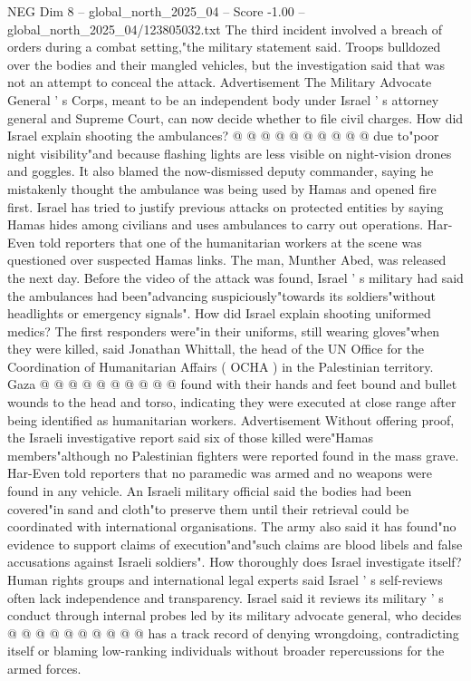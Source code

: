 \begin{textsample}{NEG Dim 8 – global\_north\_2025\_04 – Score -1.00 – global\_north\_2025\_04/123805032.txt}
The third incident involved a breach of orders during a combat setting,"the military statement said.
Troops bulldozed over the bodies and their mangled vehicles, but the investigation said that was not an attempt to conceal the attack.
Advertisement The Military Advocate General ' s Corps, meant to be an independent body under Israel ' s attorney general and Supreme Court, can now decide whether to file civil charges.
How did Israel explain shooting the ambulances? @ @ @ @ @ @ @ @ @ @ due to"poor night visibility"and because flashing lights are less visible on night-vision drones and goggles.
It also blamed the now-dismissed deputy commander, saying he mistakenly thought the ambulance was being used by Hamas and opened fire first.
Israel has tried to justify previous attacks on protected entities by saying Hamas hides among civilians and uses ambulances to carry out operations.
Har-Even told reporters that one of the humanitarian workers at the scene was questioned over suspected Hamas links.
The man, Munther Abed, was released the next day.
Before the video of the attack was found, Israel ' s military had said the ambulances had been"advancing suspiciously"towards its soldiers"without headlights or emergency signals".
How did Israel explain shooting uniformed medics?
The first responders were"in their uniforms, still wearing gloves"when they were killed, said Jonathan Whittall, the head of the UN Office for the Coordination of Humanitarian Affairs ( OCHA ) in the Palestinian territory.
Gaza @ @ @ @ @ @ @ @ @ @ found with their hands and feet bound and bullet wounds to the head and torso, indicating they were executed at close range after being identified as humanitarian workers.
Advertisement Without offering proof, the Israeli investigative report said six of those killed were"Hamas members"although no Palestinian fighters were reported found in the mass grave.
Har-Even told reporters that no paramedic was armed and no weapons were found in any vehicle.
An Israeli military official said the bodies had been covered"in sand and cloth"to preserve them until their retrieval could be coordinated with international organisations.
The army also said it has found"no evidence to support claims of execution"and"such claims are blood libels and false accusations against Israeli soldiers".
How thoroughly does Israel investigate itself?
Human rights groups and international legal experts said Israel ' s self-reviews often lack independence and transparency.
Israel said it reviews its military ' s conduct through internal probes led by its military advocate general, who decides @ @ @ @ @ @ @ @ @ @ has a track record of denying wrongdoing, contradicting itself or blaming low-ranking individuals without broader repercussions for the armed forces.

\end{textsample}
